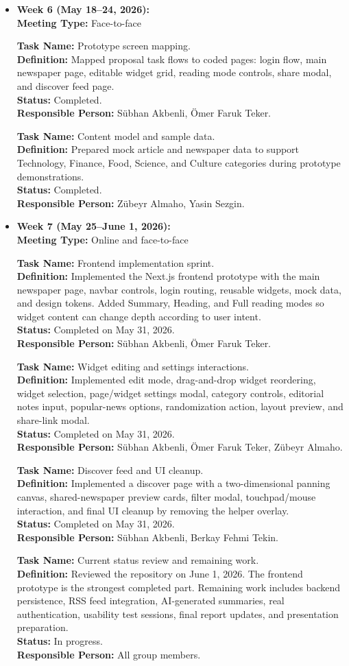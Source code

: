 \documentclass[12pt,a4paper]{article}
\newcommand{\taskentry}[4]{%
  \textbf{Task Name:} #1\\
  \textbf{Definition:} #2\\
  \textbf{Status:} #3\\
  \textbf{Responsible Person:} #4
}
\newcommand{\weekblock}[3]{%
  \item {\Large\bfseries #1}\\[-0.2em]
  \textbf{Meeting Type:} #2

  \vspace{0.25cm}
  \hspace*{0.8cm}
  \begin{minipage}[t]{0.86\textwidth}
    #3
  \end{minipage}
}
\begin{document}
\begin{itemize}[leftmargin=1.1cm, itemsep=1.45cm]
    \weekblock{Week 6 (May 18--24, 2026):}{Face-to-face}{
      \taskentry
        {Prototype screen mapping.}
        {Mapped proposal task flows to coded pages: login flow, main newspaper page, editable widget grid, reading mode controls, share modal, and discover feed page.}
        {Completed.}
        {Sübhan Akbenli, Ömer Faruk Teker.}

      \vspace{0.45cm}
      \taskentry
        {Content model and sample data.}
        {Prepared mock article and newspaper data to support Technology, Finance, Food, Science, and Culture categories during prototype demonstrations.}
        {Completed.}
        {Zübeyr Almaho, Yasin Sezgin.}
    }

    \clearpage
    \weekblock{Week 7 (May 25--June 1, 2026):}{Online and face-to-face}{
      \taskentry
        {Frontend implementation sprint.}
        {Implemented the Next.js frontend prototype with the main newspaper page, navbar controls, login routing, reusable widgets, mock data, and design tokens. Added Summary, Heading, and Full reading modes so widget content can change depth according to user intent.}
        {Completed on May 31, 2026.}
        {Sübhan Akbenli, Ömer Faruk Teker.}

      \vspace{0.45cm}
      \taskentry
        {Widget editing and settings interactions.}
        {Implemented edit mode, drag-and-drop widget reordering, widget selection, page/widget settings modal, category controls, editorial notes input, popular-news options, randomization action, layout preview, and share-link modal.}
        {Completed on May 31, 2026.}
        {Sübhan Akbenli, Ömer Faruk Teker, Zübeyr Almaho.}

      \vspace{0.45cm}
      \taskentry
        {Discover feed and UI cleanup.}
        {Implemented a discover page with a two-dimensional panning canvas, shared-newspaper preview cards, filter modal, touchpad/mouse interaction, and final UI cleanup by removing the helper overlay.}
        {Completed on May 31, 2026.}
        {Sübhan Akbenli, Berkay Fehmi Tekin.}

      \vspace{0.45cm}
      \taskentry
        {Current status review and remaining work.}
        {Reviewed the repository on June 1, 2026. The frontend prototype is the strongest completed part. Remaining work includes backend persistence, RSS feed integration, AI-generated summaries, real authentication, usability test sessions, final report updates, and presentation preparation.}
        {In progress.}
        {All group members.}
    }
\end{itemize}
\end{document}
